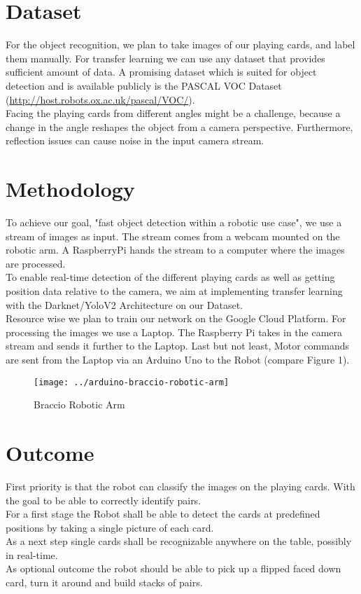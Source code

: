 \documentclass[10pt,twocolumn,letterpaper]{article}
\begin{document}
\section{Dataset}
	For the object recognition, we plan to take images of our playing cards, and label them manually.
	For transfer learning we can use any dataset that provides sufficient amount of data.
	A promising dataset which is suited for object detection and is available publicly is the PASCAL VOC Dataset (\href{http://host.robots.ox.ac.uk/pascal/VOC/}{http://host.robots.ox.ac.uk/pascal/VOC/}).\\
	Facing the playing cards from different angles might be a challenge, because a change in the angle reshapes the object from a camera perspective. Furthermore, reflection issues can cause noise in the input camera stream.
\section{Methodology}
	To achieve our goal, "fast object detection within a robotic use case", we use a stream of images as input. The stream comes from  a webcam mounted on the robotic arm. A RaspberryPi hands the stream to a computer where the images are processed.\\
	To enable real-time detection of the different playing cards as well as getting position data relative to the camera, we aim at implementing transfer learning with the Darknet/YoloV2 Architecture on our Dataset.\\
    Resource wise we plan to train our network on the Google Cloud Platform. For processing the images we use a Laptop. The Raspberry Pi takes in the camera stream and sends it further to the Laptop. Last but not least, Motor commands are sent from the Laptop via an Arduino Uno to the Robot (compare Figure 1).  
		\begin{figure}[h!]
		\centering
		\texttt{[image: ../arduino-braccio-robotic-arm]}
		\caption{Braccio Robotic Arm}
		\label{fig:arduino-braccio-robotic-arm}
		\end{figure}

\section{Outcome}
    First priority is that the robot can classify the images on the playing cards. With the goal to be able to correctly identify pairs.\\
    For a first stage the Robot shall be able to detect the cards at predefined positions by taking a single picture of each card.\\
    As a next step single cards shall be recognizable anywhere on the table, possibly in real-time.\\
    As optional outcome the robot should be able to pick up a flipped faced down card, turn it around and build stacks of pairs.
      
    

{\small


}
\end{document}
